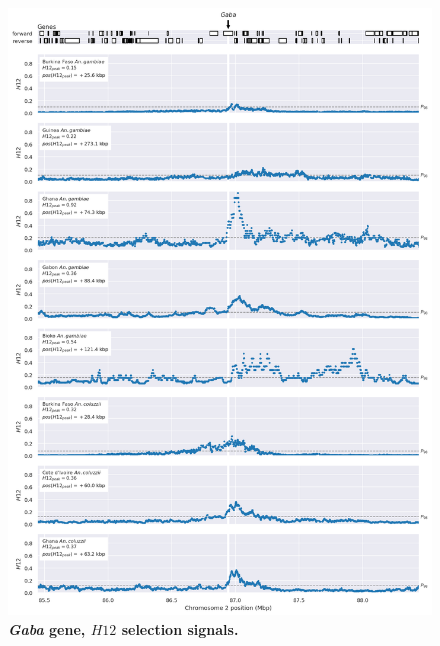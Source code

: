 \documentclass[a4paper,11pt,abstracton,hidelinks]{scrartcl}
\begin{document}
\clearpage


\begin{figure}[t!]
	\begin{center}
		\includegraphics*[width=1\linewidth,center]{artwork/locus_gaba_h12_pdist.png}
	\end{center}
	\caption[\textit{Gaba} gene, $H12$ selection signals]{
	\textbf{\textit{Gaba} gene, $H12$ selection signals.}
	} 
	\label{fig:locus_gaba_h12}
\end{figure}
\end{document}
